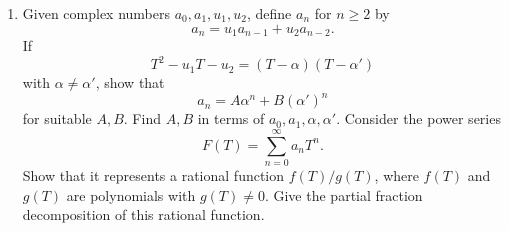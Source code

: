 \documentclass[12pt, reqno]{amsart}
\theoremstyle{definition}
\newenvironment{solution}
  {\par\smallskip\begin{tcolorbox}[breakable, enhanced, colback=solblue, colframe=solframe,
     boxrule=0.5pt, arc=2pt, left=6pt, right=6pt, top=4pt, bottom=4pt]\noindent\textbf{Solution.}}
  {\hfill$\square$\end{tcolorbox}\par\medskip}
\numberwithin{equation}{subsection}
\numberwithin{equation}{section}
\begin{document}
\begin{enumerate}
\begin{solution}
\medskip
\noindent (b) Write
\[
\sin T=T\Bigl(1-\frac{T^2}{3!}+\frac{T^4}{5!}-\cdots\Bigr)=T\bigl(1-h(T)\bigr),
\]
where
\[
h(T)=\frac{T^2}{3!}-\frac{T^4}{5!}+\cdots .
\]
Since $h$ has no constant term,
\begin{align*}
\frac{1}{\sin T}&=\frac1T\bigl(1+h(T)+h(T)^2+\cdots\bigr)
=\frac1T\Bigl(1+\frac{T^2}{3!}+\Bigl(\frac1{36}-\frac1{120}\Bigr)T^4+\cdots\Bigr)\\
&=\frac1T\Bigl(1+\frac{T^2}{3!}+\frac{7T^4}{360}+\cdots\Bigr).
\end{align*}
So
\begin{align*}
\frac{e^T}{\sin T}&=\frac1T\Bigl(1+T+\frac{T^2}{2!}+\frac{T^3}{3!}+\frac{T^4}{4!}+\cdots\Bigr)\\
&\qquad\cdot\Bigl(1+\frac{T^2}{3!}+\frac{7T^4}{360}+\cdots\Bigr)\\
&=\frac1T\Bigl(1+T+\frac23T^2+\frac13T^3+\frac{13}{90}T^4+\cdots\Bigr)\\
&=\boxed{\frac1T+1+\frac{2T}{3}+\frac{T^2}{3}+\frac{13T^3}{90}}+\cdots .
\end{align*}
(For the $T^4$ coefficient inside the parentheses: $\frac1{24}+\frac1{12}+\frac7{360}=\frac{52}{360}=\frac{13}{90}$.)
\end{solution}

\item Given complex numbers $a_0,a_1,u_1,u_2$, define $a_n$ for $n\geq 2$ by
\[
a_n=u_1a_{n-1}+u_2a_{n-2}.
\]
If
\[
T^2-u_1T-u_2=(T-\alpha)(T-\alpha')
\]
with $\alpha\neq\alpha'$, show that
\[
a_n=A\alpha^n+B(\alpha')^n
\]
for suitable $A,B$. Find $A,B$ in terms of $a_0,a_1,\alpha,\alpha'$. Consider the power series
\[
F(T)=\sum_{n=0}^{\infty}a_nT^n.
\]
Show that it represents a rational function $f(T)/g(T)$, where $f(T)$ and $g(T)$ are polynomials with $g(T)\neq 0$. Give the partial fraction decomposition of this rational function.


\end{enumerate}
\end{document}
